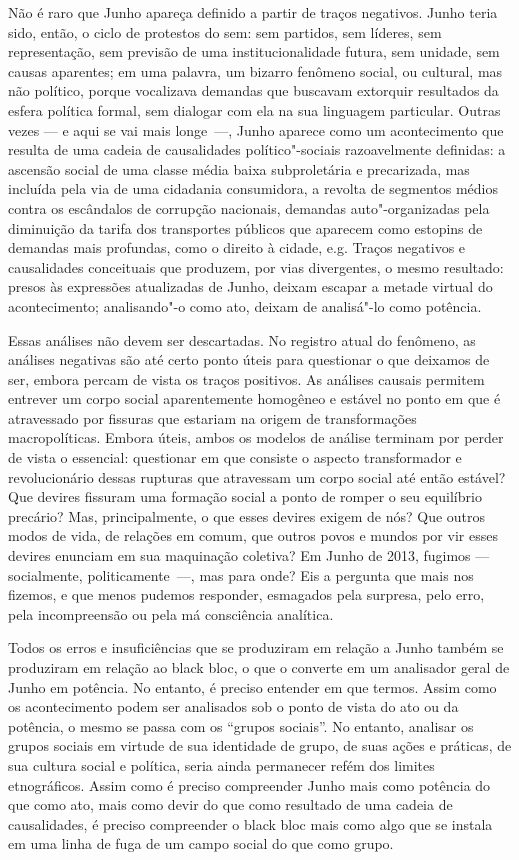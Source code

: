 Não é raro que Junho apareça definido a partir de traços negativos.
Junho teria sido, então, o ciclo de protestos do sem: sem partidos, sem
líderes, sem representação, sem previsão de uma institucionalidade
futura, sem unidade, sem causas aparentes; em uma palavra, um bizarro
fenômeno social, ou cultural, mas não político, porque vocalizava
demandas que buscavam extorquir resultados da esfera política formal,
sem dialogar com ela na sua linguagem particular. Outras vezes --- e aqui
se vai mais longe~---, Junho aparece como um acontecimento que resulta de
uma cadeia de causalidades político"-sociais razoavelmente definidas: a
ascensão social de uma classe média baixa subproletária e precarizada,
mas incluída pela via de uma cidadania consumidora, a revolta de
segmentos médios contra os escândalos de corrupção nacionais, demandas
auto"-organizadas pela diminuição da tarifa dos transportes públicos que
aparecem como estopins de demandas mais profundas, como o direito à
cidade, e.g. Traços negativos e causalidades conceituais que produzem,
por vias divergentes, o mesmo resultado: presos às expressões
atualizadas de Junho, deixam escapar a metade virtual do acontecimento;
analisando"-o como ato, deixam de analisá"-lo como potência.

Essas análises não devem ser descartadas. No registro atual do fenômeno,
as análises negativas são até certo ponto úteis para questionar o que
deixamos de ser, embora percam de vista os traços positivos. As análises
causais permitem entrever um corpo social aparentemente homogêneo e
estável no ponto em que é atravessado por fissuras que estariam na
origem de transformações macropolíticas. Embora úteis, ambos os modelos
de análise terminam por perder de vista o essencial: questionar em que
consiste o aspecto transformador e revolucionário dessas rupturas que
atravessam um corpo social até então estável? Que devires fissuram uma
formação social a ponto de romper o seu equilíbrio precário? Mas,
principalmente, o que esses devires exigem de nós? Que outros modos de
vida, de relações em comum, que outros povos e mundos por vir esses
devires enunciam em sua maquinação coletiva? Em Junho de 2013, fugimos
--- socialmente, politicamente~---, mas para onde? Eis a pergunta que mais
nos fizemos, e que menos pudemos responder, esmagados pela surpresa,
pelo erro, pela incompreensão ou pela má consciência analítica.

Todos os erros e insuficiências que se produziram em relação a Junho
também se produziram em relação ao black bloc, o que o converte em um
analisador geral de Junho em potência. No entanto, é preciso entender em
que termos. Assim como os acontecimento podem ser analisados sob o ponto
de vista do ato ou da potência, o mesmo se passa com os ``grupos
sociais''. No entanto, analisar os grupos sociais em virtude de sua
identidade de grupo, de suas ações e práticas, de sua cultura social e
política, seria ainda permanecer refém dos limites etnográficos. Assim
como é preciso compreender Junho mais como potência do que como ato,
mais como devir do que como resultado de uma cadeia de causalidades, é
preciso compreender o black bloc mais como algo que se instala em uma
linha de fuga de um campo social do que como grupo.

